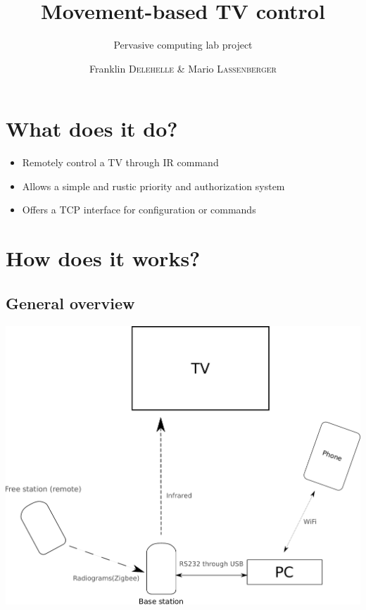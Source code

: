 \documentclass{beamer}
\title{Movement-based TV control}
\subtitle{Pervasive computing lab project}
\author{Franklin \textsc{Delehelle} \& Mario \textsc{Lassenberger}}
\date{}
\begin{document}
\begin{frame}
  \titlepage
\end{frame}
\section{What does it do?}
\begin{frame}
  \begin{itemize}
  \item Remotely control a TV through IR command
  \item Allows a simple and rustic priority and authorization system
  \item Offers a TCP interface for configuration or commands
  \end{itemize}
\end{frame}

\section{How does it works?}

\subsection{General overview}
\begin{frame}
  \begin{center}
    \includegraphics[scale=0.35]{stack.pdf}
  \end{center}
\end{frame}
\end{document}
